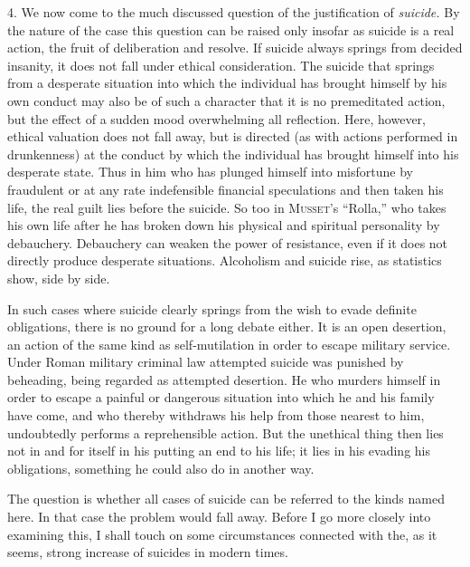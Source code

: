 \documentclass[12pt,a4paper,openany]{book}
\newcommand{\opage}[1]{\marginnote{\footnotesize\textit{[#1]}}}
\begin{document}
4. We now come to the much discussed question of the justification of \textit{suicide.} By the nature of the
case this question can be raised only insofar as suicide is a real action, the fruit of deliberation and
resolve. If suicide always springs from decided insanity, it does not fall under ethical consideration. The
suicide that springs from a desperate situation into which the individual has brought himself by his own conduct
may also be of such a character that it is no premeditated action, but the effect of a sudden mood overwhelming
all reflection. Here, however, ethical valuation does not fall away, but is directed (as with actions performed
in drunkenness) at the conduct by which the individual has brought himself into his desperate state. Thus in him
who has plunged himself into misfortune by fraudulent or at any rate indefensible financial speculations and then
taken his life, the real guilt lies before the suicide. So too in \textsc{Musset}'s ``Rolla,'' who takes his own
life after he has broken down his physical and spiritual personality by debauchery. Debauchery can weaken the
power of resistance, even if it does not directly produce desperate situations. Alcoholism and suicide rise, as
statistics show, side by side.

In such cases where suicide clearly springs from the wish to evade definite obligations, there is no ground for a
long debate either. It is an open desertion, an action of the same kind as self-mutilation in order to escape
military service. Under Roman military criminal law attempted suicide was punished by beheading, being regarded
as attempted desertion. He who murders himself in order to escape a painful or dangerous situation into which he
and his family have come, and who thereby withdraws his help from those nearest to him, undoubtedly performs a
reprehensible action. But the unethical thing then lies not in and for itself in his putting an end to his life;
it
\opage{211}lies in his evading his obligations, something he could also do in another way.

The question is whether all cases of suicide can be referred to the kinds named here. In that case the problem
would fall away. Before I go more closely into examining this, I shall touch on some circumstances connected with
the, as it seems, strong increase of suicides in modern times.
\end{document}
